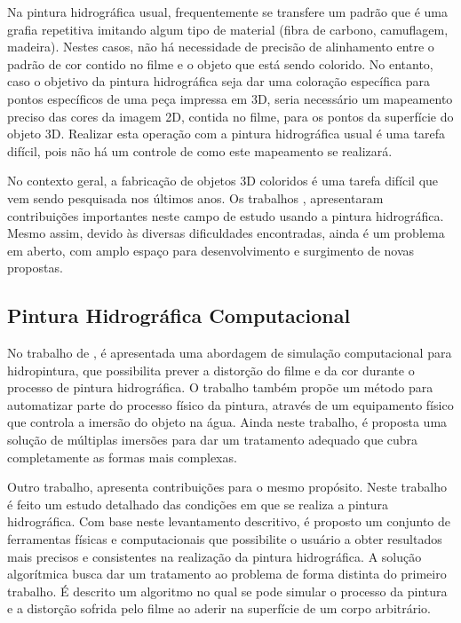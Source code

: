 Na pintura hidrográfica usual, frequentemente se transfere um padrão que é uma grafia repetitiva imitando algum tipo de material (fibra de carbono, camuflagem, madeira). Nestes casos, não há necessidade de precisão de alinhamento entre o padrão de cor contido no filme e o objeto que está sendo colorido. No entanto, caso o objetivo da pintura hidrográfica seja dar uma coloração específica para pontos específicos de uma peça impressa em 3D, seria necessário um mapeamento preciso das cores da imagem 2D, contida no filme, para os pontos da superfície do objeto 3D. Realizar esta operação com a pintura hidrográfica usual é uma tarefa difícil, pois não há um controle de como este mapeamento se realizará.

No contexto geral, a fabricação de objetos 3D coloridos é uma tarefa difícil que vem sendo pesquisada nos últimos anos. Os trabalhos \cite{zhang2015}, \cite{panozzo2015} apresentaram contribuições importantes neste campo de estudo usando a pintura hidrográfica. Mesmo assim, devido às diversas dificuldades encontradas, ainda é um problema em aberto, com amplo espaço para desenvolvimento e surgimento de novas propostas.

\subsection{Pintura Hidrográfica Computacional}

No trabalho de \cite{zhang2015}, é apresentada uma abordagem de simulação computacional para hidropintura, que possibilita prever a distorção do filme e da cor durante o processo de pintura hidrográfica. O trabalho também propõe um método para automatizar parte do processo físico da pintura, através de um equipamento físico que controla a imersão do objeto na água. Ainda neste trabalho, é proposta uma solução de múltiplas imersões para dar um tratamento adequado que cubra completamente as formas mais complexas.

Outro trabalho, \cite{panozzo2015} apresenta contribuições para o mesmo propósito. Neste trabalho é feito um estudo detalhado das condições em que se realiza a pintura hidrográfica. Com base neste levantamento descritivo, é proposto um conjunto de ferramentas físicas e computacionais que possibilite o usuário a obter resultados mais precisos e consistentes na realização da pintura hidrográfica. A solução algorítmica busca dar um tratamento ao problema de forma distinta do primeiro trabalho. É descrito um algoritmo no qual se pode simular o processo da pintura e a distorção sofrida pelo filme ao aderir na superfície de um corpo arbitrário.

